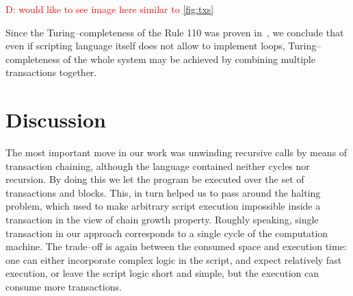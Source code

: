 \documentclass[runningheads]{llncs}
\newcommand{\dnote}[1]{\textcolor{red}{D: {#1}}}
\begin{document}
    \dnote{would like to see image here similar to \ref{fig:txs}}

    Since the Turing--completeness of the Rule 110 was proven
    in~\cite{cook2004universality}, we conclude that even if scripting
    language itself does not allow to implement loops, Turing--completeness
    of the whole system may be achieved by combining multiple transactions
    together.

    \section{Discussion}
    The most important move in our work was unwinding recursive calls by means
    of transaction chaining, although the language contained neither cycles nor
    recursion. By doing this we let the program be executed over the set of
    transactions and blocks. This, in turn helped us to pass around the halting
    problem, which used to make arbitrary script execution impossible inside a
    transaction in the view of chain growth property. Roughly speaking, single
    transaction in our approach corresponds to a single cycle of the computation
    machine. The trade--off is again between the consumed space and execution time:
    one can either incorporate complex logic in the script, and expect
    relatively fast execution, or leave the script logic short and simple, but
    the execution can consume more transactions.
\end{document}
